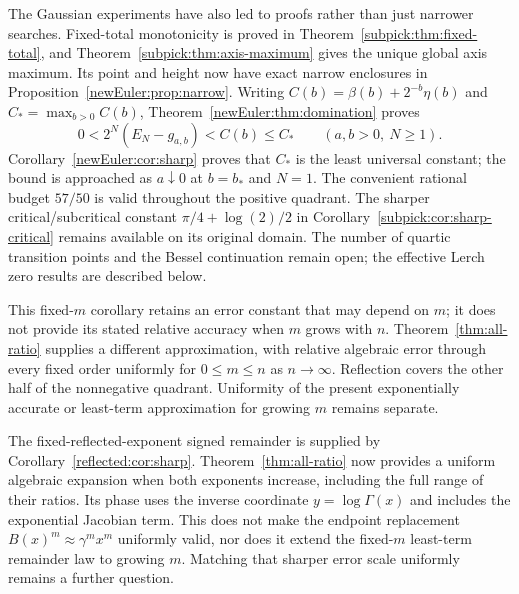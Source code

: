 The Gaussian experiments have also led to proofs rather than just
narrower searches. Fixed-total monotonicity is proved in
Theorem~\ref{subpick:thm:fixed-total}, and
Theorem~\ref{subpick:thm:axis-maximum} gives the unique global axis
maximum. Its point and height now have exact narrow enclosures in
Proposition~\ref{newEuler:prop:narrow}. Writing
$C(b)=\beta(b)+2^{-b}\eta(b)$ and $C_*=\max_{b>0}C(b)$,
Theorem~\ref{newEuler:thm:domination} proves
\[
0<2^N(E_N-g_{a,b})<C(b)\le C_*
\qquad(a,b>0,\ N\ge1).
\]
Corollary~\ref{newEuler:cor:sharp} proves that $C_*$ is the least
universal constant; the bound is approached as $a\downarrow0$ at
$b=b_*$ and $N=1$. The convenient rational budget $57/50$ is valid
throughout the positive quadrant. The sharper critical/subcritical
constant $\pi/4+\log(2)/2$ in
Corollary~\ref{subpick:cor:sharp-critical} remains available on its
original domain. The number of quartic transition points and the
Bessel continuation remain open; the effective Lerch zero results
are described below.

This fixed-$m$ corollary retains an error constant that may depend on $m$;
it does not provide its stated relative accuracy when $m$ grows with $n$.
Theorem~\ref{thm:all-ratio} supplies a different approximation, with
relative algebraic error through every fixed order uniformly for
$0\le m\le n$ as $n\to\infty$. Reflection covers the other half of
the nonnegative quadrant. Uniformity of the present exponentially
accurate or least-term approximation for growing $m$ remains separate.

The fixed-reflected-exponent signed remainder is supplied by
Corollary~\ref{reflected:cor:sharp}. Theorem~\ref{thm:all-ratio} now
provides a uniform algebraic expansion when both exponents increase,
including the full range of their ratios. Its phase uses the inverse
coordinate $y=\log\Gamma(x)$ and includes the exponential Jacobian
term. This does not make the endpoint replacement
$B(x)^m\approx\gamma^m x^m$ uniformly valid, nor does it extend the
fixed-$m$ least-term remainder law to growing $m$. Matching that sharper
error scale uniformly remains a further question.

